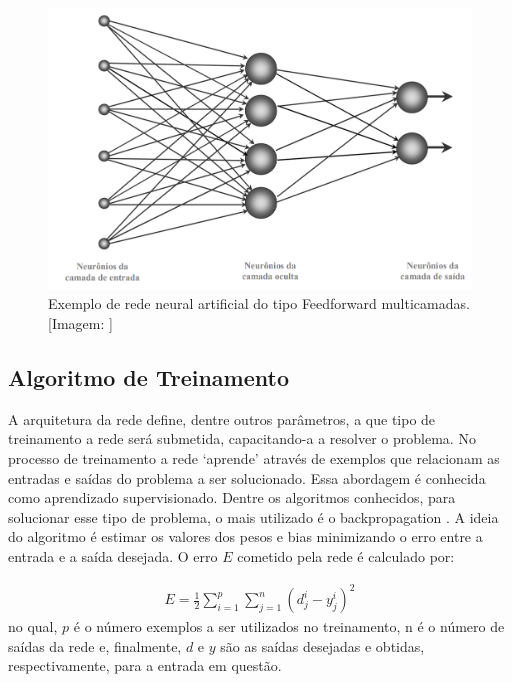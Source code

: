 
\begin{figure}[h]
\centering
\includegraphics[width=.75\textwidth]{figuras/multicamadas.png}
\caption{Exemplo de rede neural artificial do tipo Feedforward multicamadas. [Imagem: \cite{furtado2019redes}]}
\label{figredeFeedforwardMulticamada}
\end{figure}

\subsection{Algoritmo de Treinamento}
\label{subsec:redes-neurais-artificiais:algoritmo}

A arquitetura da rede define, dentre outros parâmetros, a que tipo de treinamento a rede será submetida, capacitando-a a resolver o problema. No processo de treinamento a rede ‘aprende’ através de exemplos que relacionam as entradas e saídas do problema a ser solucionado. Essa abordagem é conhecida como aprendizado supervisionado. Dentre os algoritmos conhecidos, para solucionar esse tipo de problema, o mais utilizado é o backpropagation \cite{rumelhart1986learning}. A ideia do algoritmo é estimar os valores dos pesos e bias minimizando o erro entre a entrada e a saída desejada. O erro \(E\) cometido pela rede é calculado por:

\begin{equation} \label{eq3}
\begin{split}
E = \frac{1}{2} \sum_{i=1}^{p} \sum_{j=1}^{n} (d_{j}^{i} - y_{j}^{i})^2
\end{split}
\end{equation}
no qual, \(p\) é o número exemplos a ser utilizados no treinamento, n é o número de saídas da rede e, finalmente, \(d\) e \(y\) são as saídas desejadas e obtidas, respectivamente, para a entrada em questão.

